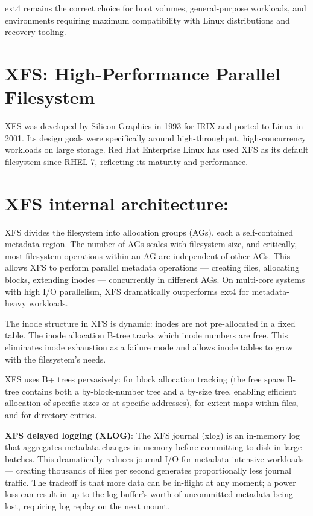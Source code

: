 ext4 remains the correct choice for boot volumes, general-purpose workloads, and environments requiring maximum compatibility with Linux distributions and recovery tooling.

\section{XFS: High-Performance Parallel Filesystem}
XFS was developed by Silicon Graphics in 1993 for IRIX and ported to Linux in 2001. Its design goals were specifically around high-throughput, high-concurrency workloads on large storage. Red Hat Enterprise Linux has used XFS as its default filesystem since RHEL 7, reflecting its maturity and performance.

\section{XFS internal architecture:}
XFS divides the filesystem into allocation groups (AGs), each a self-contained metadata region. The number of AGs scales with filesystem size, and critically, most filesystem operations within an AG are independent of other AGs. This allows XFS to perform parallel metadata operations --- creating files, allocating blocks, extending inodes --- concurrently in different AGs. On multi-core systems with high I/O parallelism, XFS dramatically outperforms ext4 for metadata-heavy workloads.

The inode structure in XFS is dynamic: inodes are not pre-allocated in a fixed table. The inode allocation B-tree tracks which inode numbers are free. This eliminates inode exhaustion as a failure mode and allows inode tables to grow with the filesystem's needs.

XFS uses B+ trees pervasively: for block allocation tracking (the free space B-tree contains both a by-block-number tree and a by-size tree, enabling efficient allocation of specific sizes or at specific addresses), for extent maps within files, and for directory entries.

\textbf{XFS delayed logging (XLOG)}: The XFS journal (xlog) is an in-memory log that aggregates metadata changes in memory before committing to disk in large batches. This dramatically reduces journal I/O for metadata-intensive workloads --- creating thousands of files per second generates proportionally less journal traffic. The tradeoff is that more data can be in-flight at any moment; a power loss can result in up to the log buffer's worth of uncommitted metadata being lost, requiring log replay on the next mount.

